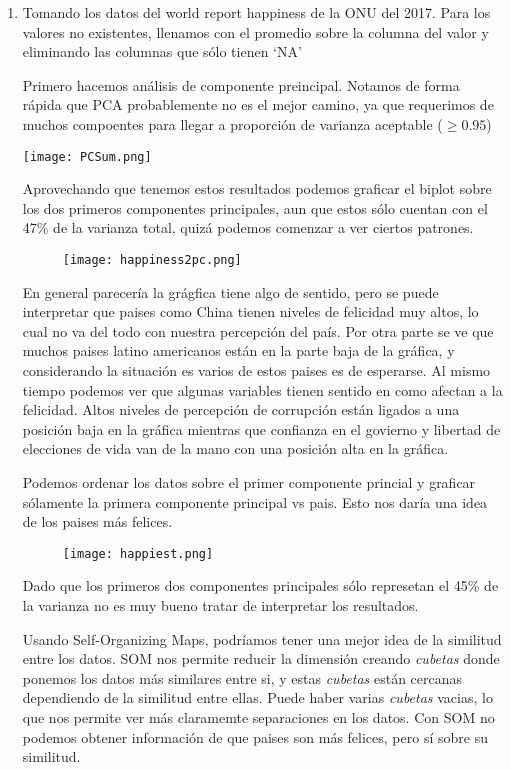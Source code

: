 \documentclass{article}
\begin{document}
\begin{enumerate}
\newpage
\item Tomando los datos del world report happiness de la ONU del 2017. Para los valores no existentes, llenamos con el promedio sobre la columna del valor y eliminando las columnas que sólo tienen `NA'

Primero hacemos análisis de componente preincipal. Notamos de forma rápida que PCA probablemente no es el mejor camino, ya que requerimos de muchos compoentes para llegar a proporción de varianza aceptable ($ \geq 0.95$)

\texttt{[image: PCSum.png]}

Aprovechando que tenemos estos resultados podemos graficar el biplot sobre los dos primeros componentes principales, aun que estos sólo cuentan con el 47\% de la varianza total, quizá podemos comenzar a ver ciertos patrones.

\begin{figure}[ht]
\centering
\texttt{[image: happiness2pc.png]}
\end{figure}

En general parecería la grágfica tiene algo de sentido, pero se puede interpretar que paises como China tienen niveles de felicidad muy altos, lo cual no va del todo con nuestra percepción del país. Por otra parte se ve que muchos paises latino americanos están en la parte baja de la gráfica, y considerando la situación es varios de estos paises es de esperarse. Al mismo tiempo podemos ver que algunas variables tienen sentido en como afectan a la felicidad. Altos niveles de percepción de corrupción están ligados a una posición baja en la gráfica mientras que confianza en el govierno y libertad de elecciones de vida van de la mano con una posición alta en la gráfica. 

Podemos ordenar los datos sobre el primer componente princial y graficar sólamente la primera componente principal vs pais. Esto nos daría una idea de los paises más felices.
\newpage

\begin{figure}[ht]
\centering
\texttt{[image: happiest.png]}
\end{figure}

Dado que los primeros dos componentes principales sólo represetan el 45\% de la varianza no es muy bueno tratar de interpretar los resultados.

Usando Self-Organizing Maps, podríamos tener una mejor idea de la similitud entre los datos. SOM nos permite reducir la dimensión creando \emph{cubetas} donde ponemos los datos más similares entre si, y estas \emph{cubetas} están cercanas dependiendo de la similitud entre ellas. Puede haber varias \emph{cubetas} vacias, lo que nos permite ver más claramemte separaciones en los datos. Con SOM no podemos obtener información de que paises son más felices, pero sí sobre su similitud.


\end{enumerate}
\end{document}
